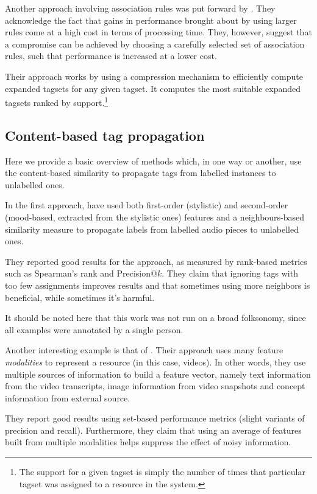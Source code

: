 Another approach involving association rules was put forward by \cite{vanleeuwen_puspitaningrum_2012}. They acknowledge the fact that gains in performance brought about by using larger rules come at a high cost in terms of processing time. They, however, suggest that a compromise can be achieved by choosing a carefully selected set of association rules, such that performance is increased at a lower cost.

Their approach works by using a compression mechanism to efficiently compute expanded tagsets for any given tagset. It computes the most suitable expanded tagsets ranked by support.\footnote{The support for a given tagset is simply the number of times that particular tagset was assigned to a resource in the system.}

\subsection{Content-based tag propagation}

Here we provide a basic overview of methods which, in one way or another, use the content-based similarity to propagate tags from labelled instances to unlabelled ones.

In the first approach, \cite{sordo_etal_2007} have used both first-order (stylistic) and second-order (mood-based, extracted from the stylistic ones) features and a neighbours-based similarity measure to propagate labels from labelled audio pieces to unlabelled ones.

They reported good results for the approach, as measured by rank-based metrics such as Spearman's rank and Precision@$k$. They claim that ignoring tags with too few assignments improves results and that sometimes using more neighbors is beneficial, while sometimes it's harmful.

It should be noted here that this work was not run on a broad folksonomy, since all examples were annotated by a single person.

Another interesting example is that of \cite{moxley_etal_2008}. Their approach uses many feature \textit{modalities} to represent a resource (in this case, videos). In other words, they use multiple sources of information to build a feature vector, namely text information from the video transcripts, image information from video snapshots and concept information from external source.

They report good results using set-based performance metrics (slight variants of precision and recall). Furthermore, they claim that using an average of features built from multiple modalities helps suppress the effect of noisy information.

